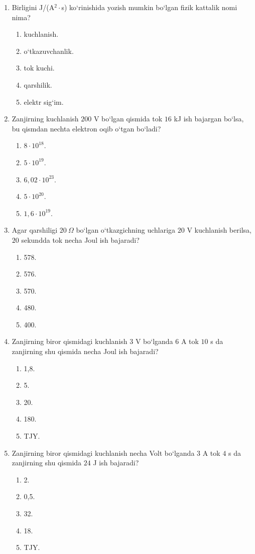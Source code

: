 \begin{enumerate}
\item Birligini J/(A$^2\cdot$s) ko‘rinishida yozish mumkin bo‘lgan fizik kattalik nomi nima?
\begin{enumerate}[label=\Alph*)]
\item kuchlanish.
\item o‘tkazuvchanlik.
\item tok kuchi.
\item qarshilik.
\item elektr sig‘im.
\end{enumerate}

\item Zanjirning kuchlanish $200$ V bo‘lgan qismida tok $16$ kJ ish bajargan bo‘lsa, bu qismdan nechta elektron oqib o‘tgan bo‘ladi?
\begin{enumerate}[label=\Alph*)]
\item $8\cdot10^{18}$.
\item $5\cdot10^{19}$.
\item $6,02\cdot10^{23}$.
\item $5\cdot10^{20}$.
\item $1,6\cdot10^{19}$.
\end{enumerate}

\item Agar qarshiligi $20~\Omega$ bo‘lgan o‘tkazgichning uchlariga $20$ V kuchlanish berilsa, $20$ sekundda tok necha Joul ish bajaradi?
\begin{enumerate}[label=\Alph*)]
\item 578.
\item 576.
\item 570.
\item 480.
\item 400.
\end{enumerate}

\item Zanjirning biror qismidagi kuchlanish $3$ V bo‘lganda $6$ A tok $10$ s da zanjirning shu qismida necha Joul ish bajaradi?
\begin{enumerate}[label=\Alph*)]
\item 1,8.
\item 5.
\item 20.
\item 180.
\item TJY.
\end{enumerate}

\item Zanjirning biror qismidagi kuchlanish necha Volt bo‘lganda $3$ A tok $4$ s da zanjirning shu qismida $24$ J ish bajaradi?
\begin{enumerate}[label=\Alph*)]
\item 2.
\item 0,5.
\item 32.
\item 18.
\item TJY.
\end{enumerate}


\end{enumerate}

